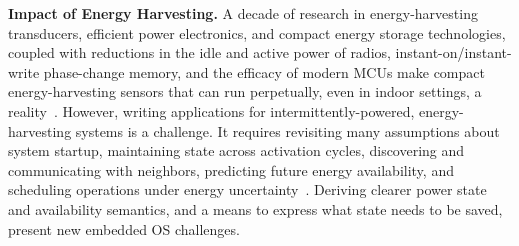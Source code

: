 \smallskip\noindent
\textbf{Impact of Energy Harvesting.}
%
%
A decade of research in energy-harvesting transducers, efficient power
electronics, and compact energy storage technologies, coupled
with reductions in the idle and active power of radios,
instant-on/instant-write phase-change memory, and the efficacy of modern MCUs
make compact energy-harvesting sensors that can run perpetually, even in
indoor settings, a reality~\cite{doubledip}.
%
However, writing applications for intermittently-powered,
energy-harvesting systems is a challenge.  It requires revisiting many
assumptions about system startup, maintaining state across activation cycles,
discovering and communicating with neighbors, predicting future energy
availability, and scheduling operations under energy uncertainty~\cite{dewdrop}.
%
Deriving clearer power state and availability semantics, and a means to express
what state needs to be saved, present new embedded OS challenges.



